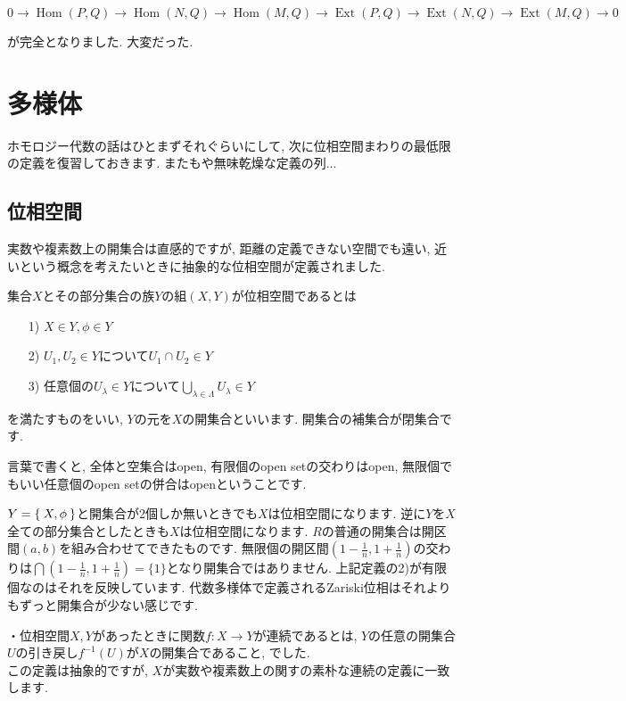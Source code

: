 \documentclass{jsarticle}
\newcommand{\makeop}[1]{\mathop{\mathrm{#1}}\nolimits}
\def\Hom{\makeop{Hom}}
\def\Ext{\makeop{Ext}}
\theoremstyle{definition}
\numberwithin{theorem}{section}
\begin{document}
\begin{equation*}
0 \rightarrow \Hom(P, Q) \rightarrow \Hom(N, Q) \rightarrow \Hom(M, Q) \rightarrow \Ext(P, Q) \rightarrow \Ext(N, Q) \rightarrow \Ext(M, Q) \rightarrow 0
\end{equation*}

が完全となりました. 大変だった. 

\section{多様体}
ホモロジー代数の話はひとまずそれぐらいにして, 次に位相空間まわりの最低限の定義を復習しておきます. またもや無味乾燥な定義の列...

\subsection{位相空間}

実数や複素数上の開集合は直感的ですが, 距離の定義できない空間でも遠い, 近いという概念を考えたいときに抽象的な位相空間が定義されました.

集合$X$とその部分集合の族$Y$の組$(X, Y)$が位相空間であるとは
\begin{itemize}
\item[1)] $X \in Y, \phi \in Y$
\item[2)] $U_1, U_2 \in Y$について$U_1 \cap U_2 \in Y$
\item[3)] 任意個の$U_\lambda \in Y$について$\bigcup_{\lambda \in \Lambda} U_\lambda \in Y$
\end{itemize}
を満たすものをいい, $Y$の元を$X$の開集合といいます. 開集合の補集合が閉集合です.

言葉で書くと, 全体と空集合はopen, 有限個のopen setの交わりはopen, 無限個でもいい任意個のopen setの併合はopenということです.

$Y = \Set{X, \phi}$と開集合が2個しか無いときでも$X$は位相空間になります. 逆に$Y$を$X$全ての部分集合としたときも$X$は位相空間になります.
$R$の普通の開集合は開区間$(a, b)$を組み合わせてできたものです. 無限個の開区間$\displaystyle (1-\frac{1}{n}, 1+\frac{1}{n})$の交わりは$\displaystyle\bigcap(1-\frac{1}{n}, 1+\frac{1}{n}) = \{1\}$となり開集合ではありません. 上記定義の2)が有限個なのはそれを反映しています. 代数多様体で定義されるZariski位相はそれよりもずっと開集合が少ない感じです.

・位相空間$X, Y$があったときに関数$f: X \rightarrow Y$が連続であるとは, $Y$の任意の開集合$U$の引き戻し$f^{-1}(U)$が$X$の開集合であること, でした.\\
この定義は抽象的ですが, $X$が実数や複素数上の関すの素朴な連続の定義に一致します.
\end{document}
